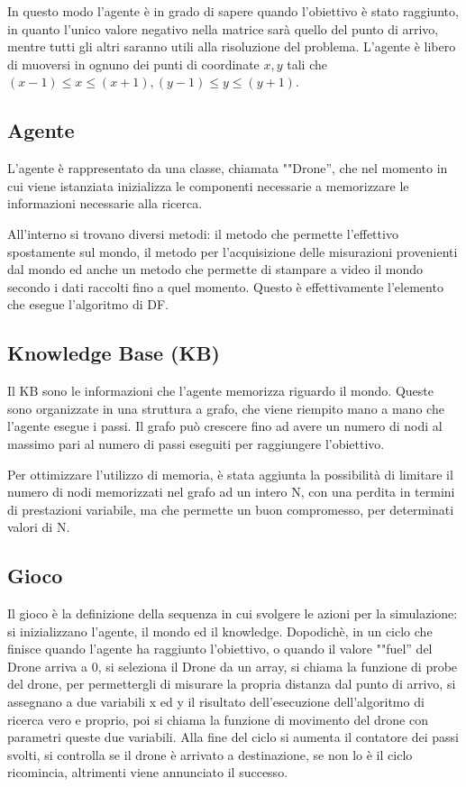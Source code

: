In questo modo l'agente è in grado di sapere quando l'obiettivo è stato raggiunto, in quanto l'unico valore negativo nella matrice sarà quello del punto di arrivo, mentre tutti gli altri saranno utili alla risoluzione del problema.
L'agente è libero di muoversi in ognuno dei punti di coordinate $ x, y $ tali che $ (x-1) \le x \le (x+1), (y-1) \le y \le (y+1) $.

\subsection{Agente}
L'agente è rappresentato da una classe, chiamata ""Drone'', che nel momento in cui viene istanziata inizializza le componenti necessarie a memorizzare le informazioni necessarie alla ricerca. 

All'interno si trovano diversi metodi: il metodo che permette l'effettivo spostamente sul mondo, il metodo per l'acquisizione delle misurazioni provenienti dal mondo ed anche un metodo che permette di stampare a video il mondo secondo i dati raccolti fino a quel momento. Questo è effettivamente l'elemento che esegue l'algoritmo di DF.

\subsection{Knowledge Base (KB)}
Il KB sono le informazioni che l'agente memorizza riguardo il mondo. Queste sono organizzate in una struttura a grafo, che viene riempito mano a mano che l'agente esegue i passi. Il grafo può crescere fino ad avere un numero di nodi al massimo pari al numero di passi eseguiti per raggiungere l'obiettivo. 

Per ottimizzare l'utilizzo di memoria, è stata aggiunta la possibilità di limitare il numero di nodi memorizzati nel grafo ad un intero N, con una perdita in termini di prestazioni variabile, ma che permette un buon compromesso, per determinati valori di N.

\subsection{Gioco}
Il gioco è la definizione della sequenza in cui svolgere le azioni per la simulazione: si inizializzano l'agente, il mondo ed il knowledge. Dopodichè, in un ciclo che finisce quando l'agente ha raggiunto l'obiettivo, o quando il valore ""fuel'' del Drone arriva a 0, si seleziona il Drone da un array, si chiama la funzione di probe del drone, per permettergli di misurare la propria distanza dal punto di arrivo, si assegnano a due variabili x ed y il risultato dell'esecuzione dell'algoritmo di ricerca vero e proprio, poi si chiama la funzione di movimento del drone con parametri queste due variabili. Alla fine del ciclo si aumenta il contatore dei passi svolti, si controlla se il drone è arrivato a destinazione, se non lo è il ciclo ricomincia, altrimenti viene annunciato il successo.

